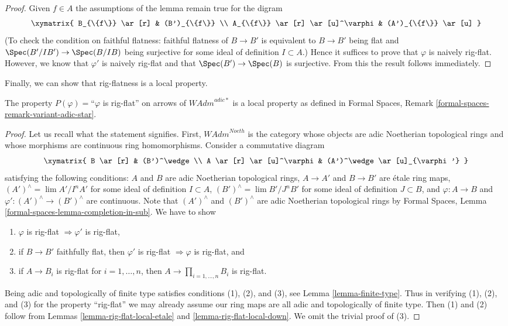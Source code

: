 \begin{proof}
Given $f \in A$ the assumptions of the lemma remain true for the digram
$$
\xymatrix{
B_{\{f\}} \ar[r] & (B')_{\{f\}} \\
A_{\{f\}} \ar[r] \ar[u]^\varphi & (A')_{\{f\}} \ar[u]
}
$$
(To check the condition on faithful flatness: faithful flatness
of $B \to B'$ is equivalent to $B \to B'$ being flat and
$\Spec(B'/IB') \to \Spec(B/IB)$ being
surjective for some ideal of definition $I \subset A$.)
Hence it suffices to prove that $\varphi$ is naively rig-flat.
However, we know that $\varphi'$ is naively rig-flat and
that $\Spec(B') \to \Spec(B)$ is surjective. From this the
result follows immediately.
\end{proof}

\noindent
Finally, we can show that rig-flatness is a local property.

\begin{lemma}
\label{lemma-rig-flat-axioms}
The property $P(\varphi)=$``$\varphi$ is rig-flat'' on arrows
of $\textit{WAdm}^{adic*}$ is a local property as defined in
Formal Spaces, Remark \ref{formal-spaces-remark-variant-adic-star}.
\end{lemma}

\begin{proof}
Let us recall what the statement signifies. First, 
$\textit{WAdm}^{Noeth}$ is the category whose objects are
adic Noetherian topological rings and whose morphisms are
continuous ring homomorphisms. Consider a commutative diagram
$$
\xymatrix{
B \ar[r] & (B')^\wedge \\
A \ar[r] \ar[u]^\varphi & (A')^\wedge \ar[u]_{\varphi'}
}
$$
satisfying the following conditions:
$A$ and $B$ are adic Noetherian topological rings,
$A \to A'$ and $B \to B'$ are \'etale ring maps,
$(A')^\wedge = \lim A'/I^nA'$ for some ideal of definition $I \subset A$,
$(B')^\wedge = \lim B'/J^nB'$ for some ideal of definition $J \subset B$, and
$\varphi : A \to B$ and $\varphi' : (A')^\wedge \to (B')^\wedge$
are continuous. Note that $(A')^\wedge$ and $(B')^\wedge$ are
adic Noetherian topological rings by
Formal Spaces, Lemma \ref{formal-spaces-lemma-completion-in-sub}.
We have to show
\begin{enumerate}
\item $\varphi$ is rig-flat $\Rightarrow \varphi'$ is rig-flat,
\item if $B \to B'$ faithfully flat, then $\varphi'$ is rig-flat
$\Rightarrow \varphi$ is rig-flat, and
\item if $A \to B_i$ is rig-flat for $i = 1, \ldots, n$, then
$A \to \prod_{i = 1, \ldots, n} B_i$ is rig-flat.
\end{enumerate}
Being adic and topologically of finite type satisfies
conditions (1), (2), and (3), see Lemma \ref{lemma-finite-type}.
Thus in verifying (1), (2), and (3) for the property
``rig-flat'' we may already assume our ring maps are all adic
and topologically of finite type. Then (1) and (2) follow
from Lemmas \ref{lemma-rig-flat-local-etale} and
\ref{lemma-rig-flat-local-down}.
We omit the trivial proof of (3).
\end{proof}

